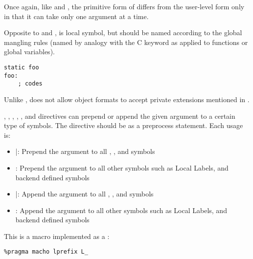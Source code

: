 Once again, like  and , the primitive form of
 differs from the user-level form only in that it can take
only one argument at a time.


Opposite to  and ,  is local
symbol, but should be named according to the global mangling rules
(named by analogy with the C keyword  as applied to
functions or global variables).

\begin{lstlisting}
static foo
foo:
    ; codes
\end{lstlisting}

Unlike ,  does not allow object formats
to accept private extensions mentioned in .


, , , ,
, and  directives can prepend or
append the given argument to a certain type of symbols. The directive
should be as a preprocess statement. Each usage is:

\begin{itemize}
    \item{|: Prepend the argument to all
         , , and
         symbols}

    \item{: Prepend the argument to all other symbols
        such as Local Labels, and backend defined symbols}

    \item{|: Append the argument to
        all  , , and
         symbols}

    \item{: Append the argument to all other symbols
        such as Local Labels, and backend defined symbols}
\end{itemize}

This is a macro implemented as a :

\begin{lstlisting}
%pragma macho lprefix L_
\end{lstlisting}

